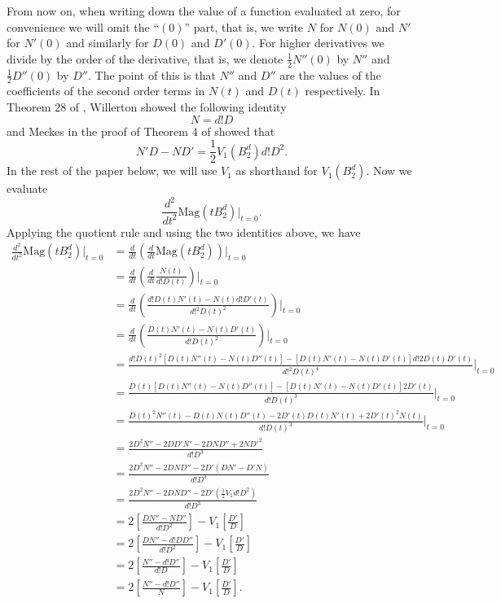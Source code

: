 \documentclass[11pt]{article}
\theoremstyle{mythm}
\begin{document}
From now on, when writing down the value of a function evaluated at zero, for convenience we will omit the ``$(0)$'' part, that is, we write $N$ for $N(0)$ and $N'$ for $N'(0)$ and similarly for $D(0)$ and $D'(0)$. For higher derivatives we divide by the order of the derivative, that is, we denote $\frac{1}{2}N''(0)$ by $N''$ and $\frac{1}{2}D''(0)$ by $D''$. The point of this is that $N''$ and $D''$ are the values of the coefficients of the second order terms in $N(t)$ and $D(t)$ respectively. In Theorem 28 of \cite{willerton_magnitude_2017}, Willerton showed the following identity
\begin{equation*}
N = d!D
\end{equation*}
and Meckes in the proof of Theorem 4 of \cite{meckes_magnitude_2019} showed that
\begin{equation*}
N'D - ND' = \frac{1}{2}V_1\left(B_2^d\right)d!D^2.
\end{equation*}
In the rest of the paper below, we will use $V_1$ as shorthand for $V_1\left(B_2^d\right)$.
Now we evaluate
\begin{equation*}
\frac{d^2}{dt^2}\text{Mag}(tB_2^d)\big\vert_{t=0}.
\end{equation*}
Applying the quotient rule and using the two identities above, we have
\begin{align*}
\frac{d^2}{dt^2}\text{Mag}(tB_2^d)\big\vert_{t=0} &= \frac{d}{dt}\left(\frac{d}{dt}\text{Mag}(tB_2^d)\right)\big\vert_{t=0} \\
&= \frac{d}{dt}\left(\frac{d}{dt}\frac{N(t)}{d!D(t)}\right)\big\vert_{t=0} \\
&= \frac{d}{dt}\left(\frac{d!D(t)N'(t)-N(t)d!D'(t)}{d!^2D(t)^2}\right)\big\vert_{t=0} \\
&= \frac{d}{dt}\left(\frac{D(t)N'(t)-N(t)D'(t)}{d!D(t)^2}\right)\big\vert_{t=0} \\
&= \frac{d!D(t)^2[D(t)N''(t)-N(t)D''(t)]-[D(t)N'(t)-N(t)D'(t)]d!2D(t)D'(t)}{d!^2D(t)^4}\big\vert_{t=0} \\
&= \frac{D(t)[D(t)N''(t)-N(t)D''(t)]-[D(t)N'(t)-N(t)D'(t)]2D'(t)}{d!D(t)^3}\big\vert_{t=0} \\
&= \frac{D(t)^2N''(t)-D(t)N(t)D''(t)-2D'(t)D(t)N'(t)+2D'(t)^2N(t)}{d!D(t)^3}\big\vert_{t=0} \\
&= \frac{2D^2N''-2DD'N'-2DND''+2ND'^2}{d!D^3} \\
&= \frac{2D^2N''-2DND''-2D'(DN'-D'N)}{d!D^3} \\
&= \frac{2D^2N''-2DND''-2D'(\frac{1}{2}V_1d!D^2)}{d!D^3} \\
&= 2\left[\frac{DN''-ND''}{d!D^2}\right]-V_1\left[\frac{D'}{D}\right] \\
&= 2\left[\frac{DN''-d!DD''}{d!D^2}\right] - V_1\left[\frac{D'}{D}\right] \\
&= 2\left[\frac{N''-d!D''}{d!D}\right] - V_1\left[\frac{D'}{D}\right] \\
&= 2\left[\frac{N''-d!D''}{N}\right] - V_1\left[\frac{D'}{D}\right].
\end{align*}
\end{document}
